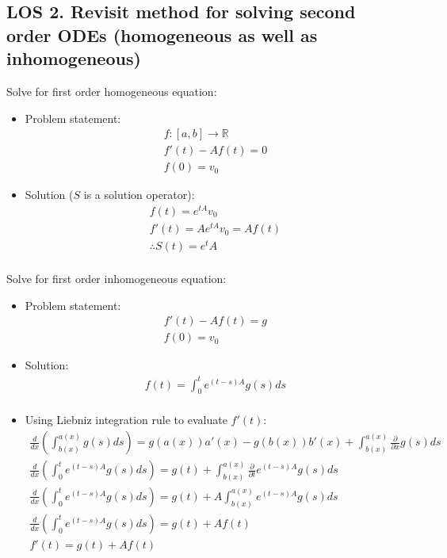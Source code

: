\documentclass[12pt, a4paper]{article}
\begin{document}
\subsection*{LOS 2. Revisit method for solving second order ODEs (homogeneous as well as inhomogeneous)}
Solve for first order homogeneous equation:
\begin{itemize}
    \item Problem statement:
    \begin{gather*}
        f: [a, b] \rightarrow \mathbb{R} \\
        f'(t) - Af(t) = 0 \\
        f(0) = v_0
    \end{gather*}
    \item Solution ($S$ is a solution operator):
    \begin{gather*}
        f(t) = e^{tA}v_0\\
        f'(t) = Ae^{tA}v_0 = Af(t)\\
        \therefore S(t)=e^tA\\
    \end{gather*}
\end{itemize}
Solve for first order inhomogeneous equation:
\begin{itemize}
    \item Problem statement:
    \begin{gather*}
        f'(t) - Af(t) = g \\
        f(0) = v_0
    \end{gather*}
    \item Solution:
    \begin{gather*}
        f(t) = \int_0^t e^{(t-s)A}g(s)ds \\
    \end{gather*}
    \item Using Liebniz integration rule to evaluate $f'(t)$:
    \begin{gather*}
        \frac{d}{dx}\left(\int_{b(x)}^{a(x)} g(s) ds\right) = g(a(x))a'(x)-g(b(x))b'(x) + \int_{b(x)}^{a(x)} \frac{\partial}{\partial x}g(s) ds\\
        \frac{d}{dx}\left(\int_0^t e^{(t-s)A}g(s)ds\right) = g(t) + \int_{b(x)}^{a(x)} \frac{\partial}{\partial t}e^{(t-s)A}g(s) ds\\
        \frac{d}{dx}\left(\int_0^t e^{(t-s)A}g(s)ds\right) = g(t) + A\int_{b(x)}^{a(x)}e^{(t-s)A}g(s) ds\\
        \frac{d}{dx}\left(\int_0^t e^{(t-s)A}g(s)ds\right) = g(t) + Af(t)\\
        f'(t) = g(t) + Af(t)\\
    \end{gather*}
\end{itemize}
\end{document}
